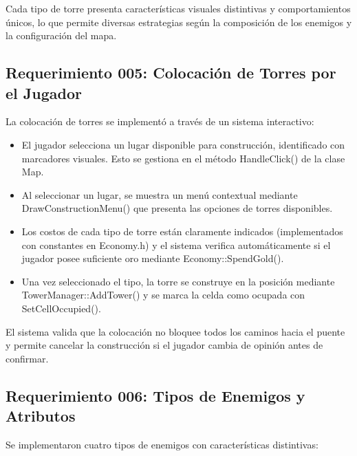 \documentclass[a4paper,num-refs]{oup-contemporary}
\begin{document}
Cada tipo de torre presenta características visuales distintivas y comportamientos únicos, lo que permite diversas estrategias según la composición de los enemigos y la configuración del mapa.

\subsection{Requerimiento 005: Colocación de Torres por el Jugador}
La colocación de torres se implementó a través de un sistema interactivo:

\begin{itemize}
    \item El jugador selecciona un lugar disponible para construcción, identificado con marcadores visuales. Esto se gestiona en el método HandleClick() de la clase Map.
    \item Al seleccionar un lugar, se muestra un menú contextual mediante DrawConstructionMenu() que presenta las opciones de torres disponibles.
    \item Los costos de cada tipo de torre están claramente indicados (implementados con constantes en Economy.h) y el sistema verifica automáticamente si el jugador posee suficiente oro mediante Economy::SpendGold().
    \item Una vez seleccionado el tipo, la torre se construye en la posición mediante TowerManager::AddTower() y se marca la celda como ocupada con SetCellOccupied().
\end{itemize}

El sistema valida que la colocación no bloquee todos los caminos hacia el puente y permite cancelar la construcción si el jugador cambia de opinión antes de confirmar.

\subsection{Requerimiento 006: Tipos de Enemigos y Atributos}
Se implementaron cuatro tipos de enemigos con características distintivas:
\end{document}
